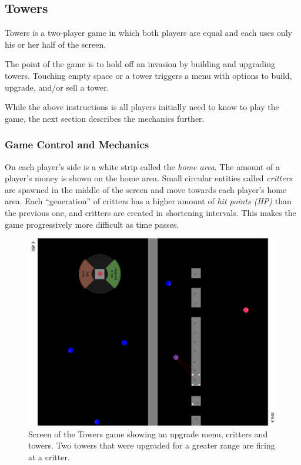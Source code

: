 \documentclass[a4paper,11pt]{article}
\begin{document}
\subsection{Towers}

Towers is a two-player game in which both players are equal and each uses
only his or her half of the screen.

The point of the game is to hold off an invasion by building and upgrading
towers.
Touching empty space or a tower triggers a menu with options to build, upgrade,
and/or sell a tower.

While the above instructions is all players initially need to know to play the
game, the next section describes the mechanics further.

\subsubsection{Game Control and Mechanics}

On each player's side is a white strip called the \emph{home area}. The amount
of a player's money is shown on the home area.
Small circular entities called \emph{critters} are spawned in the middle of the
screen and move towards each player's home area.
Each “generation” of critters has a higher amount of \emph{hit points (HP)}
than the previous one, and critters are created in shortening intervals.
This makes the game progressively more difficult as time passes.

\begin{figure}[hb]
    \includegraphics[width=13cm]{scsh-towers}
\caption{Screen of the Towers game showing an upgrade menu, critters and towers.
        Two towers that were upgraded for a greater range are firing at a critter.}
\hspace{1em}
\label{scsh-towers}
\end{figure}
\end{document}
